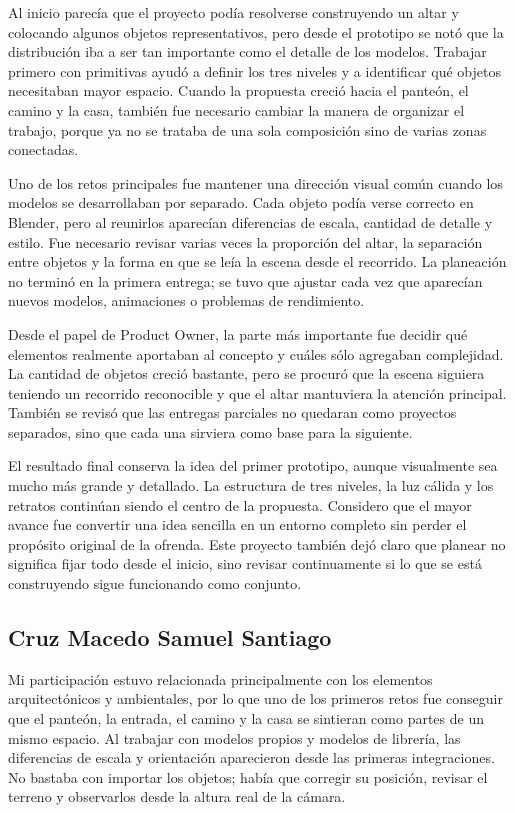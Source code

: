 \documentclass[letter,12pt]{article}
\begin{document}
Al inicio parecía que el proyecto podía resolverse construyendo un altar y colocando algunos objetos representativos, pero desde el prototipo se notó que la distribución iba a ser tan importante como el detalle de los modelos. Trabajar primero con primitivas ayudó a definir los tres niveles y a identificar qué objetos necesitaban mayor espacio. Cuando la propuesta creció hacia el panteón, el camino y la casa, también fue necesario cambiar la manera de organizar el trabajo, porque ya no se trataba de una sola composición sino de varias zonas conectadas.

Uno de los retos principales fue mantener una dirección visual común cuando los modelos se desarrollaban por separado. Cada objeto podía verse correcto en Blender, pero al reunirlos aparecían diferencias de escala, cantidad de detalle y estilo. Fue necesario revisar varias veces la proporción del altar, la separación entre objetos y la forma en que se leía la escena desde el recorrido. La planeación no terminó en la primera entrega; se tuvo que ajustar cada vez que aparecían nuevos modelos, animaciones o problemas de rendimiento.

Desde el papel de Product Owner, la parte más importante fue decidir qué elementos realmente aportaban al concepto y cuáles sólo agregaban complejidad. La cantidad de objetos creció bastante, pero se procuró que la escena siguiera teniendo un recorrido reconocible y que el altar mantuviera la atención principal. También se revisó que las entregas parciales no quedaran como proyectos separados, sino que cada una sirviera como base para la siguiente.

El resultado final conserva la idea del primer prototipo, aunque visualmente sea mucho más grande y detallado. La estructura de tres niveles, la luz cálida y los retratos continúan siendo el centro de la propuesta. Considero que el mayor avance fue convertir una idea sencilla en un entorno completo sin perder el propósito original de la ofrenda. Este proyecto también dejó claro que planear no significa fijar todo desde el inicio, sino revisar continuamente si lo que se está construyendo sigue funcionando como conjunto.

\subsection*{Cruz Macedo Samuel Santiago}

Mi participación estuvo relacionada principalmente con los elementos arquitectónicos y ambientales, por lo que uno de los primeros retos fue conseguir que el panteón, la entrada, el camino y la casa se sintieran como partes de un mismo espacio. Al trabajar con modelos propios y modelos de librería, las diferencias de escala y orientación aparecieron desde las primeras integraciones. No bastaba con importar los objetos; había que corregir su posición, revisar el terreno y observarlos desde la altura real de la cámara.
\end{document}
